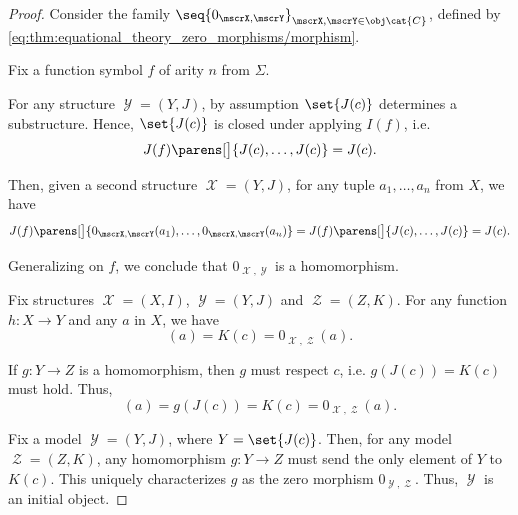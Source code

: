 \begin{proof}
   Consider the family \( \seq{ 0_{\mscrX, \mscrY} }_{\mscrX, \mscrY \in \obj \cat{C}} \), defined by \eqref{eq:thm:equational_theory_zero_morphisms/morphism}.

   Fix a function symbol \( f \) of arity \( n \) from \( \Sigma \).

  For any structure \( \mscrY = (Y, J) \), by assumption \( \set{ J(c) } \) determines a substructure. Hence, \( \set{ J(c) } \) is closed under applying \( I(f) \), i.e.
  \begin{equation*}
    J(f)\parens[\big]{ J(c), \ldots, J(c) } = J(c).
  \end{equation*}

  Then, given a second structure \( \mscrX = (Y, J) \), for any tuple \( a_1, \ldots, a_n \) from \( X \), we have
  \begin{equation*}
    J(f)\parens[\big]{ 0_{\mscrX, \mscrY}(a_1), \ldots, 0_{\mscrX, \mscrY}(a_n) } = J(f)\parens[\big]{ J(c), \ldots, J(c) } = J(c).
  \end{equation*}

  Generalizing on \( f \), we conclude that \( 0_{\mscrX, \mscrY} \) is a homomorphism.

   Fix structures \( \mscrX = (X, I) \), \( \mscrY = (Y, J) \) and \( \mscrZ = (Z, K) \). For any function \( h: X \to Y \) and any \( a \) in \( X \), we have
  \begin{equation*}
    [0_{\mscrY, \mscrZ} \bincirc h](a) = K(c) = 0_{\mscrX, \mscrZ}(a).
  \end{equation*}

  If \( g: Y \to Z \) is a homomorphism, then \( g \) must respect \( c \), i.e. \( g(J(c)) = K(c) \) must hold. Thus,
  \begin{equation*}
    [g \bincirc 0_{\mscrX, \mscrY}](a) = g(J(c)) = K(c) = 0_{\mscrX, \mscrZ}(a).
  \end{equation*}

   Fix a model \( \mscrY = (Y, J) \), where \( Y = \set{ J(c) } \). Then, for any model \( \mscrZ = (Z, K) \), any homomorphism \( g: Y \to Z \) must send the only element of \( Y \) to \( K(c) \). This uniquely characterizes \( g \) as the zero morphism \( 0_{\mscrY, \mscrZ} \). Thus, \( \mscrY \) is an initial object.


\end{proof}
